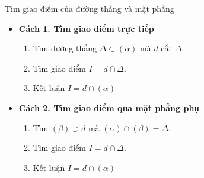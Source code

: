 \begin{dang}{Tìm giao điểm của đường thẳng và mặt phẳng}
	\begin{itemize}
		\item \textbf{Cách 1. Tìm giao điểm trực tiếp}
		\begin{enumerate}
			\item Tìm đường thẳng $\Delta \subset \left(\alpha\right)$ mà $d$ cắt $\Delta$.
			\item Tìm giao điểm $ I = d \cap \Delta $.
			\item Kết luận $I = d \cap \left(\alpha\right)$
		\end{enumerate}
		\item \textbf{Cách 2. Tìm giao điểm qua mặt phẳng phụ}
		\begin{enumerate}
			\item Tìm $\left(\beta\right) \supset d$ mà $\left(\alpha\right) \cap \left(\beta\right) = \Delta$.
			\item Tìm giao điểm $ I = d \cap \Delta $.
			\item Kết luận $I = d \cap \left(\alpha\right)$
		\end{enumerate}
	\end{itemize}
\end{dang}
